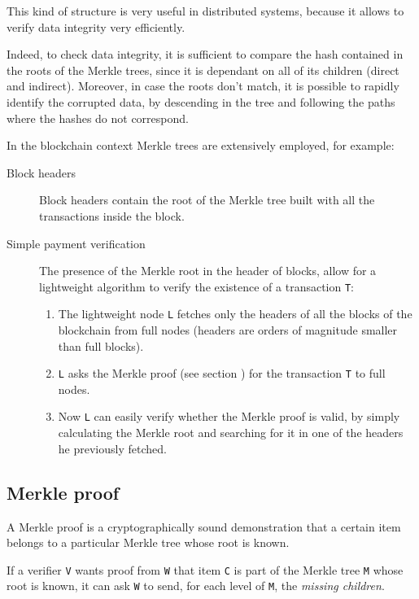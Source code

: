 \documentclass[12pt]{article}
\begin{document}
This kind of structure is very useful in distributed systems, because it allows to verify data integrity very efficiently.

Indeed, to check data integrity, it is sufficient to compare the hash contained in the roots of the Merkle trees, since it is dependant on all of its children (direct and indirect).
Moreover, in case the roots don't match, it is possible to rapidly identify the corrupted data, by descending in the tree and following the paths where the hashes do not correspond.

In the blockchain context Merkle trees are extensively employed, for example:
\begin{description}
    \item[Block headers] Block headers contain the root of the Merkle tree built with all the transactions inside the block.
    \item[Simple payment verification] The presence of the Merkle root in the header of blocks, allow for a lightweight algorithm to verify the existence of a transaction \verb|T|:
        \begin{enumerate}
            \item The lightweight node \verb|L| fetches only the headers of all the blocks of the blockchain from full nodes (headers are orders of magnitude smaller than full blocks).
            \item \verb|L| asks the Merkle proof (see section ) for the transaction \verb|T| to full nodes.
            \item Now \verb|L| can easily verify whether the Merkle proof is valid, by simply calculating the Merkle root and searching for it in one of the headers he previously fetched.
        \end{enumerate} 
\end{description}

\subsection{Merkle proof} \label{subsection:merkle_proof}
A Merkle proof is a cryptographically sound demonstration that a certain item belongs to a particular Merkle tree whose root is known.

If a verifier \verb|V| wants proof from \verb|W| that item \verb|C| is part of the Merkle tree \verb|M| whose root is known, it can ask \verb|W| to send, for each level of \verb|M|, the \textit{missing children}.
\end{document}
